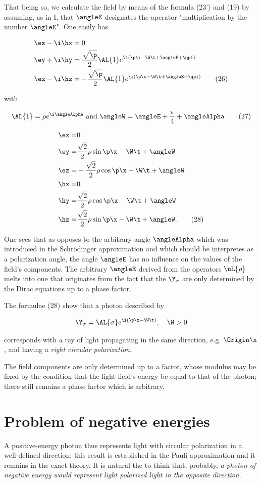 \documentclass{article}
\newcommand{\nequ}[2]{
\begin{align*}
#1
\tag{#2}
\end{align*}
}
\newcommand{\uequ}[1]{
\begin{align*}
#1
\end{align*}
}
\newcommand{\const}[1]{#1}
\renewcommand{\it}[1]{\textit{#1}}
\renewcommand{\exp}[1]{\const{e}^{#1}}
\begin{document}
\begin{multicols}{2}
That being so, we calculate the field by means of the formula (23') and (19) by assuming, as in I, that $\angleE$ designates the operator "multiplication by the number $\angleE$". One easily has
\nequ{
\ex - \i\hx &= 0 \\
\ey + \i\hy &= \frac{\sqrt{\p}}{2}\AL{1}\exp{\i(\p\x-\W\t + \angleE + \qpi)} \\
\ez - \i\hz &= -\frac{\sqrt{\p}}{2}\AL{1}\exp{\i(\p\x-\W\t + \angleE + \qpi)}
}{26}
with
\nequ{
\AL{1} = \rho\exp{\i\angleAlpha} \text{ and } \angleW = \angleE + \frac{\pi}{4} + \angleAlpha
}{27}
\nequ{
\ex =& 0 \\
\ey =&  \frac{\sqrt{2}}{2}\rho\sin{\p\x-\W\t+\angleW}\\
\ez =& -\frac{\sqrt{2}}{2}\rho\cos{\p\x-\W\t+\angleW}\\
\hx =& 0 \\
\hy =&  \frac{\sqrt{2}}{2}\rho\cos{\p\x-\W\t+\angleW}\\
\hz =&  \frac{\sqrt{2}}{2}\rho\sin{\p\x-\W\t+\angleW}.
}{28}

One sees that as opposes to the arbitrary angle $\angleAlpha$ which was introduced in the Schrödinger approximation and which should be interpretes as a polarization angle, the angle $\angleE$ has no influence on the values of the field's components. The arbitrary $\angleE$ derived from the operators $\uL{\rho}$ melts into one that originates from the fact that the $\Y_\sigma$ are only determined by the Dirac equations up to a phase factor.

The formulae (28) show that a photon described by
\uequ{
\Y_\sigma = \AL{\sigma}\exp{\i(\p\x-\W\t)}, \quad \W > 0
}
corresponds with a ray of light propagating in the same direction, e.g. $\Origin\x$, and having a \it{right circular polarization}.

The field components are only determined up to a factor, whose modulus may be fixed by the condition that the light field's energy be equal to that of the photon; there still remains a phase factor which is arbitrary.

\section{Problem of negative energies}
A positive-energy photon thus represents light with circular polarization in a well-defined direction; this result is established in the Pauli approximation and it remains in the exact theory. It is natural the to think that, probably, \it{a photon of negative energy would represent light polarized light in the opposite direction}.


\end{multicols}
\end{document}
